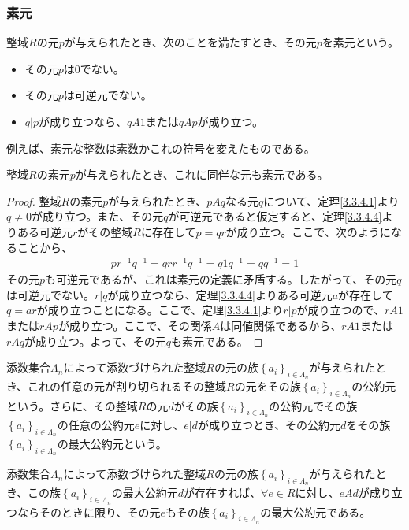 \documentclass[dvipdfmx]{jsarticle}
\begin{document}
\subsubsection{素元}%
\begin{dfn}
整域$R$の元$p$が与えられたとき、次のことを満たすとき、その元$p$を素元という。
\begin{itemize}
\item
  その元$p$は$0$でない。
\item
  その元$p$は可逆元でない。
\item
  $q|p$が成り立つなら、$qA1$または$qAp$が成り立つ。
\end{itemize}
\end{dfn}\par
例えば、素元な整数は素数かこれの符号を変えたものである。
\begin{thm}\label{3.3.4.5}
整域$R$の素元$p$が与えられたとき、これに同伴な元も素元である。
\end{thm}
\begin{proof}
整域$R$の素元$p$が与えられたとき、$pAq$なる元$q$について、定理\ref{3.3.4.1}より$q \neq 0$が成り立つ。また、その元$q$が可逆元であると仮定すると、定理\ref{3.3.4.4}よりある可逆元$r$がその整域$R$に存在して$p = qr$が成り立つ。ここで、次のようになることから、
\begin{align*}
pr^{-1}q^{-1} = qrr^{-1}q^{-1} = q1q^{-1} = qq^{-1} = 1
\end{align*}
その元$p$も可逆元であるが、これは素元の定義に矛盾する。したがって、その元$q$は可逆元でない。$r|q$が成り立つなら、定理\ref{3.3.4.4}よりある可逆元$a$が存在して$q = ar$が成り立つことになる。ここで、定理\ref{3.3.4.1}より$r|p$が成り立つので、$rA1$または$rAp$が成り立つ。ここで、その関係$A$は同値関係であるから、$rA1$または$rAq$が成り立つ。よって、その元$q$も素元である。
\end{proof}
\begin{dfn}
添数集合$\varLambda_{n}$によって添数づけられた整域$R$の元の族$\left\{ a_{i} \right\}_{i \in \varLambda_{n}}$が与えられたとき、これの任意の元が割り切られるその整域$R$の元をその族$\left\{ a_{i} \right\}_{i \in \varLambda_{n}}$の公約元という。さらに、その整域$R$の元$d$がその族$\left\{ a_{i} \right\}_{i \in \varLambda_{n}}$の公約元でその族$\left\{ a_{i} \right\}_{i \in \varLambda_{n}}$の任意の公約元$e$に対し、$e|d$が成り立つとき、その公約元$d$をその族$\left\{ a_{i} \right\}_{i \in \varLambda_{n}}$の最大公約元という。
\end{dfn}
\begin{thm}\label{3.3.4.6}
添数集合$\varLambda_{n}$によって添数づけられた整域$R$の元の族$\left\{ a_{i} \right\}_{i \in \varLambda_{n}}$が与えられたとき、この族$\left\{ a_{i} \right\}_{i \in \varLambda_{n}}$の最大公約元$d$が存在すれば、$\forall e \in R$に対し、$eAd$が成り立つならそのときに限り、その元$e$もその族$\left\{ a_{i} \right\}_{i \in \varLambda_{n}}$の最大公約元である。
\end{thm}
\end{document}
